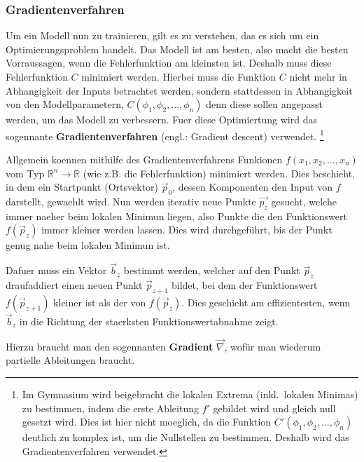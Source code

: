 \documentclass[../main]{subfiles}
\begin{document}
\subsubsection{Gradientenverfahren}
Um ein Modell nun zu trainieren, gilt es zu verstehen, das es sich um ein Optimierungsproblem handelt.
Das Modell ist am besten, also macht die besten Vorraussagen, wenn die Fehlerfunktion am kleinsten ist.
Deshalb muss diese Fehlerfunktion $C$ minimiert werden.
Hierbei muss die Funktion $C$ nicht mehr in Abhangigkeit der Inputs betrachtet werden, sondern stattdessen in Abhangigkeit von den Modellparametern,
$C(\phi_1, \phi_2, \ldots, \phi_n)$ denn diese sollen angepasst werden, um das Modell zu verbessern.
Fuer diese Optimiertung wird das sogennante \textbf{Gradientenverfahren} (engl.: Gradient descent) verwendet.
\footnote{
  Im Gymnasium wird beigebracht die lokalen Extrema (inkl.\ lokalen Minimas) zu bestimmen, indem die erste Ableitung $f'$ gebildet wird und  gleich null gesetzt wird.
  Dies ist hier nicht moeglich, da die Funktion $C'(\phi_1,\phi_2, \ldots, \phi_n)$ deutlich zu komplex ist, um die Nullstellen zu bestimmen. Deshalb wird das Gradientenverfahren verwendet.
}
\par\medskip
Allgemein koennen mithilfe des Gradientenverfahrens Funkionen $f(x_1, x_2, \ldots, x_n)$ vom Typ $\mathbb{R}^n \to \mathbb{R}$ (wie z.B. die Fehlerfunktion) minimiert werden.
Dies beschieht, in dem ein Startpunkt (Ortsvektor) $\vec{p}_0$, dessen Komponenten den Input von $f$ darstellt, gewaehlt wird.
Nun werden iterativ neue Punkte $\vec{p_z}$ gesucht, welche immer naeher beim lokalen Minimun liegen, also Punkte die den Funktionswert $f(\vec{p}_z)$ immer kleiner werden lassen.
Dies wird durchgeführt, bis der Punkt genug nahe beim lokalen Minimun ist.
\par\medskip
Dafuer muss ein Vektor $\vec{b}_z$ bestimmt werden, welcher auf den Punkt $\vec{p}_z$ draufaddiert einen neuen Punkt $\vec{p}_{z+1}$ bildet,
bei dem der Funktionswert $f(\vec{p}_{z+1})$ kleiner ist als der von $f(\vec{p}_z)$.
Dies geschieht am effizientesten, wenn $\vec{b}_z$ in die Richtung der staerksten Funktionswertabnahme zeigt.

Hierzu braucht man den sogennanten \textbf{Gradient} $\vec{\nabla}$, wofür man wiederum partielle Ableitungen braucht.
\par\medskip
\end{document}
